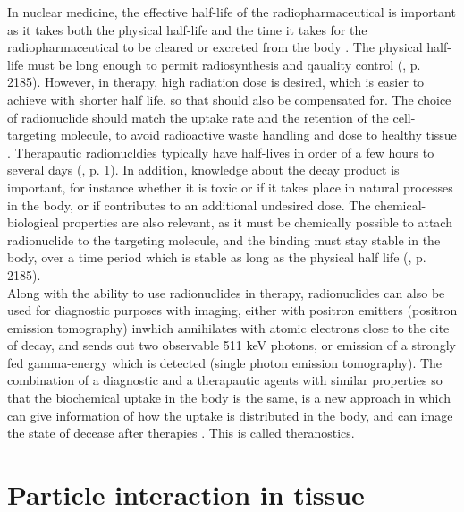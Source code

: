 In nuclear medicine, the effective half-life of the radiopharmaceutical is important as it takes both the physical half-life and the time it takes for the radiopharmaceutical to be cleared or excreted from the body \cite{Yeong2014a}. The physical half-life must be long enough to permit radiosynthesis and qauality control (\cite{Vertes2011a}, p. 2185). However, in therapy, high radiation dose is desired, which is easier to achieve with shorter half life, so that should also be compensated for. The choice of radionuclide should match the uptake rate and the retention of the cell-targeting molecule, to avoid radioactive waste handling and dose to healthy tissue \cite{Yeong2014a}. Therapautic radionucldies typically have half-lives  in order of a few hours to several days (\cite{international2012iaea}, p. 1). In addition, knowledge about the decay product is important, for instance whether it is toxic or if it takes place in natural processes in the body, or if contributes to an additional undesired dose. The chemical-biological properties are also relevant, as it must be chemically possible to attach radionuclide to the targeting molecule, and the binding must stay stable in the body, over a time period which is stable as long as the physical half life (\cite{Vertes2011a}, p. 2185). \\

\noindent
Along with the ability to use radionuclides in therapy, radionuclides can also be used for diagnostic purposes with imaging, either with positron emitters (positron emission tomography) inwhich annihilates with atomic electrons close to the cite of decay, and sends out two observable 511 keV photons, or emission of a strongly fed gamma-energy which is detected (single photon emission tomography). The combination of a diagnostic and a therapautic agents with similar properties so that the biochemical uptake in the body is the same, is a new approach in which can give information of how the uptake is distributed in the body, and can image the state of decease after therapies \cite{Rosch2017a}. This is called theranostics. 

\section{Particle interaction in tissue}  \label{sec:particle_interactions}

